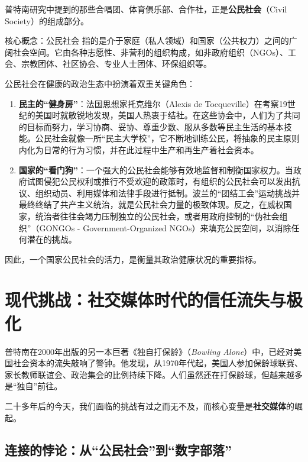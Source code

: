 \documentclass[a5paper, 11pt, openany]{ctexbook}
\begin{document}
普特南研究中提到的那些合唱团、体育俱乐部、合作社，正是\textbf{公民社会}（Civil Society）的组成部分。

\begin{coreconcept}{核心概念：公民社会}
    指的是介于家庭（私人领域）和国家（公共权力）之间的广阔社会空间。它由各种志愿性、非营利的组织构成，如非政府组织（NGOs）、工会、宗教团体、社区协会、专业人士团体、环保组织等。
\end{coreconcept}

公民社会在健康的政治生态中扮演着双重关键角色：

\begin{enumerate}
    \item \textbf{民主的“健身房”}：法国思想家托克维尔（Alexis de Tocqueville）在考察19世纪的美国时就敏锐地发现，美国人热衷于结社。在这些协会中，人们为了共同的目标而努力，学习协商、妥协、尊重少数、服从多数等民主生活的基本技能。公民社会就像一所“民主大学校”，它不断地训练公民，将抽象的民主原则内化为日常的行为习惯，并在此过程中生产和再生产着社会资本。
    \item \textbf{国家的“看门狗”}：一个强大的公民社会能够有效地监督和制衡国家权力。当政府试图侵犯公民权利或推行不受欢迎的政策时，有组织的公民社会可以发出抗议、组织动员、利用媒体和法律手段进行抵制。波兰的“团结工会”运动挑战并最终终结了共产主义统治，就是公民社会力量的极致体现。反之，在威权国家，统治者往往会竭力压制独立的公民社会，或者用政府控制的“伪社会组织”（GONGOs - Government-Organized NGOs）来填充公民空间，以消除任何潜在的挑战。
\end{enumerate}

因此，一个国家公民社会的活力，是衡量其政治健康状况的重要指标。

\section{现代挑战：社交媒体时代的信任流失与极化}

普特南在2000年出版的另一本巨著《独自打保龄》（\textit{Bowling Alone}）中，已经对美国社会资本的流失敲响了警钟。他发现，从1970年代起，美国人参加保龄球联赛、家长教师联谊会、政治集会的比例持续下降。人们虽然还在打保龄球，但越来越多是“独自”前往。

二十多年后的今天，我们面临的挑战有过之而无不及，而核心变量是\textbf{社交媒体}的崛起。

\subsection{连接的悖论：从“公民社会”到“数字部落”}
\end{document}
